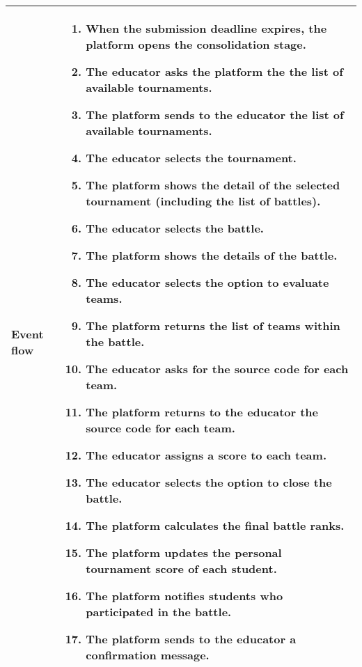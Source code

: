 \begin{enumerate}[label=\textbf{UC\arabic*}:,ref=UC\arabic*,leftmargin=1.3cm]
{\begin{table}[H]
\begin{tabular}{|l|p{11.9cm}|}
                        \textbf{Event flow}      &
                        \begin{enumerate}[label=\arabic*.]
                              \item When the submission deadline expires, the platform opens the consolidation stage.
                              \item The educator asks the platform the the list of available tournaments.
                              \item The platform sends to the educator the list of available tournaments.
                              \item The educator selects the tournament.
                              \item The platform shows the detail of the selected tournament (including the list of battles).
                              \item The educator selects the battle.
                              \item The platform shows the details of the battle.
                              \item The educator selects the option to evaluate teams.
                              \item The platform returns the list of teams within the battle.
                              \item The educator asks for the source code for each team.
                              \item The platform returns to the educator the source code for each team.
                              \item The educator assigns a score to each team.
                              \item The educator selects the option to close the battle.
                              \item The platform calculates the final battle ranks.
                              \item The platform updates the personal tournament score of each student.
                              \item The platform notifies students who participated in the battle.
                              \item The platform sends to the educator a confirmation message.
                        \end{enumerate}                                        \\\hline

\end{tabular}
\end{table}}
\end{enumerate}
